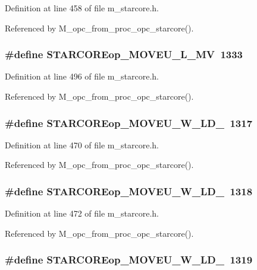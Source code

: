 Definition at line 458 of file m\_\-starcore.h.

Referenced by M\_\-opc\_\-from\_\-proc\_\-opc\_\-starcore().
\subsubsection{\setlength{\rightskip}{0pt plus 5cm}\#define STARCOREop\_\-MOVEU\_\-L\_\-MV~1333}\label{m__starcore_8h_0918df8ec35cfd05173f307134801e02}




Definition at line 496 of file m\_\-starcore.h.

Referenced by M\_\-opc\_\-from\_\-proc\_\-opc\_\-starcore().
\subsubsection{\setlength{\rightskip}{0pt plus 5cm}\#define STARCOREop\_\-MOVEU\_\-W\_\-LD\_~1317}\label{m__starcore_8h_48c0fbc4458fc0bf063ba2bff7a36cef}




Definition at line 470 of file m\_\-starcore.h.

Referenced by M\_\-opc\_\-from\_\-proc\_\-opc\_\-starcore().
\subsubsection{\setlength{\rightskip}{0pt plus 5cm}\#define STARCOREop\_\-MOVEU\_\-W\_\-LD\_~1318}\label{m__starcore_8h_7355d2b158b8fa62fd504cee8d06c1c8}




Definition at line 472 of file m\_\-starcore.h.

Referenced by M\_\-opc\_\-from\_\-proc\_\-opc\_\-starcore().
\subsubsection{\setlength{\rightskip}{0pt plus 5cm}\#define STARCOREop\_\-MOVEU\_\-W\_\-LD\_~1319}\label{m__starcore_8h_110d4e4744afe24403f1e606b924cfed}




